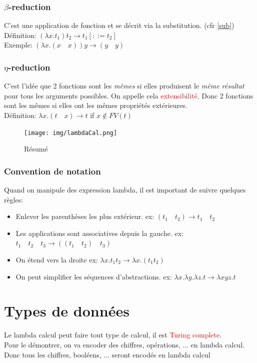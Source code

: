 \documentclass{report}
\begin{document}
\subsubsection{$\beta$-reduction}
C'est une application de fonction et se décrit via la substitution. (cfr \ref{sub})\\
Définition:  $(\lambda x.t_1) t_2 \rightarrow t_1[::=t_2]$\\
Exemple: $(\lambda x.(x \quad x))y \rightarrow (y \quad y)$

\subsubsection{$\eta$-reduction}
C'est l'idée que 2 fonctions sont les \textit{mêmes} si elles produisent le \textit{même résultat} pour tous les arguments possibles. On appelle cela \textcolor{red}{extensibilité}. Donc 2 fonctions sont les mêmes si elles ont les mêmes propriétés extérieures.\\
Définition: $\lambda x.(t \quad x) \rightarrow t$ if $x \notin FV(t)$

\begin{figure}[H]
\centering
\texttt{[image: img/lambdaCal.png]}
\caption{Résumé}
\end{figure}

\subsubsection{Convention de notation}
Quand on manipule des expression lambda, il est important de suivre quelques règles:
\begin{itemize}
\item Enlever les parenthèses les plus extérieur. ex: $(t_1 \quad t_2) \rightarrow t_1 \quad t_2$
\item Les applications sont associatives depuis la gauche. ex: $t_1 \quad t_2 \quad t_3 \rightarrow ((t_1 \quad t_2) \quad t_3)$
\item On étend vers la droite ex: $\lambda x.t_1 t_2 \rightarrow \lambda x.(t_1 t_2)$
\item On peut simplifier les séquences d'abstractions. ex: $\lambda x. \lambda y. \lambda z.t \rightarrow \lambda xyz.t$
\end{itemize}

\section{Types de données}
Le lambda calcul peut faire tout type de calcul, il est \textcolor{red}{Turing complete}.\\
Pour le démontrer, on va encoder des chiffres, opérations, ... en lambda calcul. Donc tous les chiffres, booléens, ... seront encodés en lambda calcul
\end{document}

